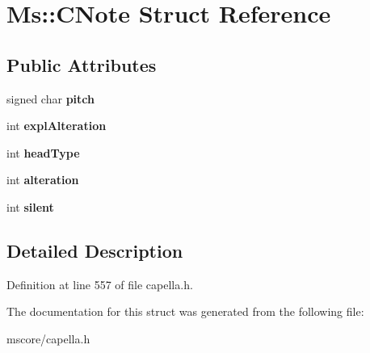 \hypertarget{struct_ms_1_1_c_note}{}\section{Ms\+:\+:C\+Note Struct Reference}
\label{struct_ms_1_1_c_note}
\subsection*{Public Attributes}
\begin{DoxyCompactItemize}
\item 
\mbox{\label{struct_ms_1_1_c_note_ae84d6e592a70f975f806745d4647788d}} 
signed char {\bfseries pitch}
\item 
\mbox{\label{struct_ms_1_1_c_note_a1c283bf080702452ed763dd03c949fad}} 
int {\bfseries expl\+Alteration}
\item 
\mbox{\label{struct_ms_1_1_c_note_a997c87212a629146ec48b617d4c2b2e0}} 
int {\bfseries head\+Type}
\item 
\mbox{\label{struct_ms_1_1_c_note_a6c56a084f2a0e8b6ef732e92f7eca985}} 
int {\bfseries alteration}
\item 
\mbox{\label{struct_ms_1_1_c_note_a72a5d69b1daf4b92c9a8d19c2243a851}} 
int {\bfseries silent}
\end{DoxyCompactItemize}


\subsection{Detailed Description}


Definition at line 557 of file capella.\+h.



The documentation for this struct was generated from the following file\+:\begin{DoxyCompactItemize}
\item 
mscore/capella.\+h\end{DoxyCompactItemize}
